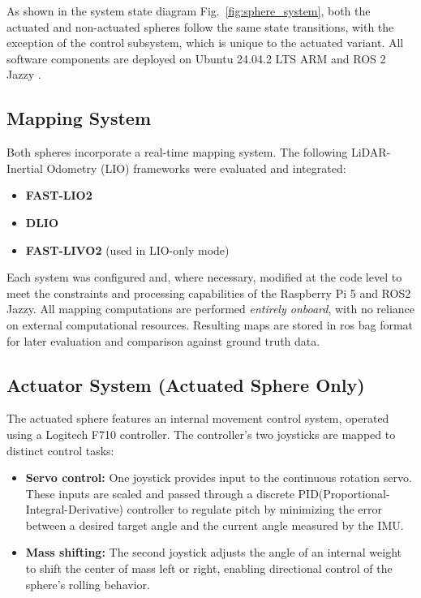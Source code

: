\documentclass[conference]{IEEEtran}
\begin{document}
As shown in the system state diagram Fig.~\ref{fig:sphere_system}, both the actuated and non-actuated spheres follow the same state transitions, with the exception of the control subsystem, which is unique to the actuated variant. All software components are deployed on Ubuntu 24.04.2 LTS ARM and ROS 2 Jazzy .

\subsection{Mapping System}

Both spheres incorporate a real-time mapping system. The following LiDAR-Inertial Odometry (LIO) frameworks were evaluated and integrated:

\begin{itemize}
    \item \textbf{FAST-LIO2}
    \item \textbf{DLIO}
    \item \textbf{FAST-LIVO2} (used in LIO-only mode)
\end{itemize}

Each system was configured and, where necessary, modified at the code level to meet the constraints and processing capabilities of the Raspberry Pi 5 and ROS2 Jazzy. All mapping computations are performed \textit{entirely onboard}, with no reliance on external computational resources. Resulting maps are stored in ros bag format for later evaluation and comparison against ground truth data.

\subsection{Actuator System (Actuated Sphere Only)}

The actuated sphere features an internal movement control system, operated using a  Logitech F710 controller. The controller's two joysticks are mapped to distinct control tasks:



\begin{itemize}
    \item \textbf{Servo control:} One joystick provides input to the continuous rotation servo. These inputs are scaled and passed through a discrete PID(Proportional-Integral-Derivative) controller to regulate pitch by minimizing the error between a desired target angle and the current angle measured by the IMU.

    \item \textbf{Mass shifting:} The second joystick adjusts the angle of an internal weight to shift the center of mass left or right, enabling directional control of the sphere's rolling behavior.
\end{itemize}
\end{document}
